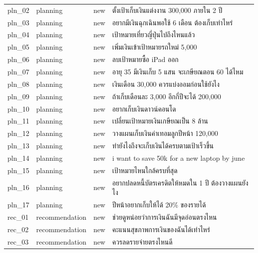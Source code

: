 \documentclass[11pt,a4paper]{article}
\begin{document}
{\begin{longtable}{lllp{9.5cm}}
pln\_\allowbreak{}02 & planning & new & {\thaifont ตั้งเป้าเก็บเงินแต่งงาน }300,000 {\thaifont ภายใน }2 {\thaifont ปี} \\
pln\_\allowbreak{}03 & planning & new & {\thaifont อยากมีเงินฉุกเฉินพอใช้ }6 {\thaifont เดือน ต้องเก็บเท่าไหร่} \\
pln\_\allowbreak{}04 & planning & new & {\thaifont เป้าหมายเที่ยวญี่ปุ่นไปถึงไหนแล้ว} \\
pln\_\allowbreak{}05 & planning & new & {\thaifont เพิ่มเงินเข้าเป้าหมายรถใหม่ }5,000 \\
pln\_\allowbreak{}06 & planning & new & {\thaifont ลบเป้าหมายซื้อ }iPad {\thaifont ออก} \\
pln\_\allowbreak{}07 & planning & new & {\thaifont อายุ }35 {\thaifont มีเงินเก็บ }5 {\thaifont แสน จะเกษียณตอน }60 {\thaifont ได้ไหม} \\
pln\_\allowbreak{}08 & planning & new & {\thaifont เงินเดือน }30,000 {\thaifont ควรแบ่งออมก่อนใช้ยังไง} \\
pln\_\allowbreak{}09 & planning & new & {\thaifont ถ้าเก็บเดือนละ }3,000 {\thaifont อีกกี่ปีจะได้ }200,000 \\
pln\_\allowbreak{}10 & planning & new & {\thaifont อยากเก็บเงินดาวน์คอนโด} \\
pln\_\allowbreak{}11 & planning & new & {\thaifont เปลี่ยนเป้าหมายเงินเกษียณเป็น }8 {\thaifont ล้าน} \\
pln\_\allowbreak{}12 & planning & new & {\thaifont วางแผนเก็บเงินค่าเทอมลูกปีหน้า }120,000 \\
pln\_\allowbreak{}13 & planning & new & {\thaifont ทำยังไงถึงจะเก็บเงินได้ครบตามเป้าเร็วขึ้น} \\
pln\_\allowbreak{}14 & planning & new & i want to save 50k for a new laptop by june \\
pln\_\allowbreak{}15 & planning & new & {\thaifont เป้าหมายไหนใกล้ครบที่สุด} \\
pln\_\allowbreak{}16 & planning & new & {\thaifont อยากปลดหนี้บัตรเครดิตให้หมดใน }1 {\thaifont ปี ต้องวางแผนยังไง} \\
pln\_\allowbreak{}17 & planning & new & {\thaifont ปีหน้าอยากเก็บให้ได้ }20\% {\thaifont ของรายได้} \\
rec\_\allowbreak{}01 & recommendation & new & {\thaifont ช่วยดูหน่อยว่าการเงินฉันมีจุดอ่อนตรงไหน} \\
rec\_\allowbreak{}02 & recommendation & new & {\thaifont คะแนนสุขภาพการเงินของฉันได้เท่าไหร่} \\
rec\_\allowbreak{}03 & recommendation & new & {\thaifont ควรลดรายจ่ายตรงไหนดี} \\

\end{longtable}}
\end{document}
